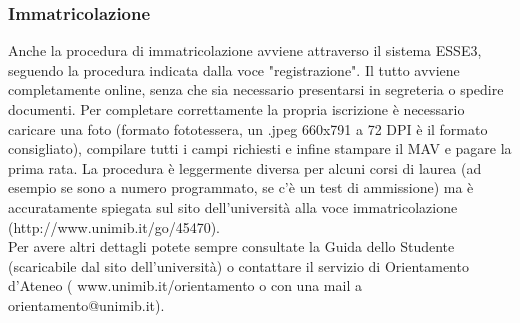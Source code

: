 \subsubsection{Immatricolazione}
Anche la procedura di immatricolazione avviene attraverso il sistema ESSE3, seguendo la procedura indicata dalla voce "registrazione". Il tutto avviene completamente online, senza che sia necessario presentarsi in segreteria o spedire documenti. Per completare correttamente la propria iscrizione è necessario caricare una foto (formato fototessera, un .jpeg 660x791 a 72 DPI è il formato consigliato), compilare tutti i campi richiesti e infine stampare il MAV e pagare la prima rata.
La procedura è leggermente diversa per alcuni corsi di laurea (ad esempio se sono a numero programmato, se c'è un test di ammissione) ma è accuratamente spiegata sul sito dell'università alla voce immatricolazione (http://www.unimib.it/go/45470).\\
Per avere altri dettagli potete sempre consultate la Guida dello Studente (scaricabile dal sito dell'università) o contattare il servizio di Orientamento d'Ateneo ( www.unimib.it/orientamento o con una mail a orientamento@unimib.it).
